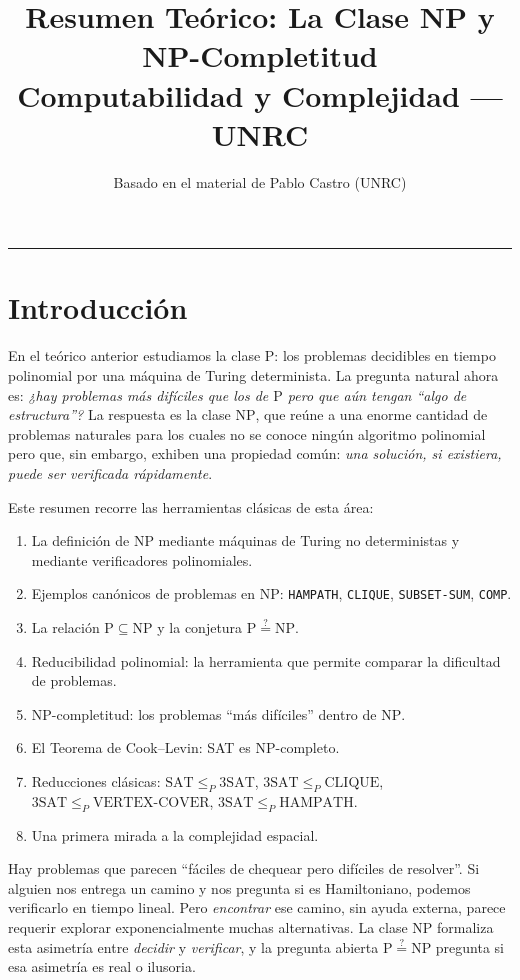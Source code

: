 \documentclass[11pt,a4paper]{article}
\title{\textbf{Resumen Teórico: La Clase NP y NP-Completitud}\\[0.3em]
\large Computabilidad y Complejidad --- UNRC}
\author{Basado en el material de Pablo Castro (UNRC)}
\date{}
\theoremstyle{definicion}
\newcommand{\redP}{\leq_{P}}
\newcommand{\NP}{\mathrm{NP}}
\newcommand{\Pclass}{\mathrm{P}}
\begin{document}
\maketitle

\tableofcontents

\vspace{1em}
\hrule
\vspace{1em}

\section{Introducción}

En el teórico anterior estudiamos la clase $\Pclass$: los problemas decidibles en tiempo polinomial por una máquina de Turing determinista. La pregunta natural ahora es: \emph{¿hay problemas más difíciles que los de $\Pclass$ pero que aún tengan ``algo de estructura''?} La respuesta es la clase $\NP$, que reúne a una enorme cantidad de problemas naturales para los cuales no se conoce ningún algoritmo polinomial pero que, sin embargo, exhiben una propiedad común: \emph{una solución, si existiera, puede ser verificada rápidamente}.

Este resumen recorre las herramientas clásicas de esta área:
\begin{enumerate}
    \item La definición de $\NP$ mediante máquinas de Turing no deterministas y mediante verificadores polinomiales.
    \item Ejemplos canónicos de problemas en $\NP$: \texttt{HAMPATH}, \texttt{CLIQUE}, \texttt{SUBSET-SUM}, \texttt{COMP}.
    \item La relación $\Pclass \subseteq \NP$ y la conjetura $\Pclass \overset{?}{=} \NP$.
    \item Reducibilidad polinomial: la herramienta que permite comparar la dificultad de problemas.
    \item NP-completitud: los problemas ``más difíciles'' dentro de $\NP$.
    \item El Teorema de Cook--Levin: SAT es NP-completo.
    \item Reducciones clásicas: $\mathrm{SAT} \redP 3\mathrm{SAT}$, $3\mathrm{SAT} \redP \mathrm{CLIQUE}$, $3\mathrm{SAT} \redP \mathrm{VERTEX\text{-}COVER}$, $3\mathrm{SAT} \redP \mathrm{HAMPATH}$.
    \item Una primera mirada a la complejidad espacial.
\end{enumerate}

\begin{intuicion}
Hay problemas que parecen ``fáciles de chequear pero difíciles de resolver''. Si alguien nos entrega un camino y nos pregunta si es Hamiltoniano, podemos verificarlo en tiempo lineal. Pero \emph{encontrar} ese camino, sin ayuda externa, parece requerir explorar exponencialmente muchas alternativas. La clase $\NP$ formaliza esta asimetría entre \emph{decidir} y \emph{verificar}, y la pregunta abierta $\Pclass \overset{?}{=} \NP$ pregunta si esa asimetría es real o ilusoria.
\end{intuicion}
\end{document}
